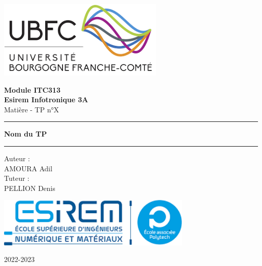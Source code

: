 \begin{center}
    
    \includegraphics[width=0.6\textwidth]{Image/Logo/UBFC.png}
    
    \Huge
    \vspace{2cm}
    \textbf{Module ITC313\\\vspace{0.4cm}Esirem Infotronique 3A}
    \vspace{0.75cm}
    \\Matière - TP n°X

    \vspace{0.5cm}
    \color{esirem}\rule{\textwidth}{1pt}
    \begin{center}
        \vspace{0.3cm}
        \Huge
        \color{black}\textbf{Nom du TP}   
    \end{center}
    \rule{\textwidth}{1pt}

    \vspace{0.5cm}
    \color{black}\Large 
    Auteur :\\
    AMOURA Adil\\
    \vspace{0.5cm}
    Tuteur :\\
    PELLION Denis
    \vspace{1.5cm}

    \includegraphics[width=0.7\textwidth]{Image/Logo/ESIREM.png}
        
    \vfill
    \Large
    2022-2023
            
\end{center}
\newpage
\begingroup
    \Large
    \renewcommand{\contentsname}{Sommaire}
    \tableofcontents
    \Large
    \renewcommand{\listfigurename}{Table des Figures}
    \listoffigures
\endgroup
\newpage